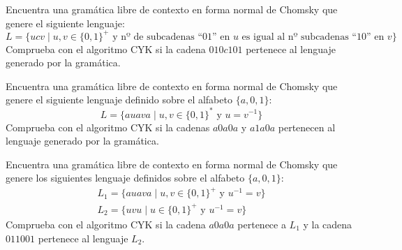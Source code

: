 \begin{ejercicio}\label{ej:1.6.11}
    Encuentra una gramática libre de contexto en forma normal de Chomsky que genere el siguiente lenguaje:
    \begin{equation*}
        L = \{ucv \mid u,v\in {\{0,1\}}^{+} \text{\ y nº de subcadenas ``} 01 \text{'' en\ } u \text{\ es igual al nº subcadenas ``}10 \text{'' en\ }v\}
    \end{equation*}
    Comprueba con el algoritmo CYK si la cadena $010c101$ pertenece al lenguaje generado por la gramática.


    
\end{ejercicio}

\begin{ejercicio}\label{ej:1.6.12}
    Encuentra una gramática libre de contexto en forma normal de Chomsky que genere el siguiente lenguaje definido sobre el alfabeto $\{a,0,1\}$:
    \begin{equation*}
        L = \{auava \mid u,v\in {\{0,1\}}^{\ast} \text{\ y\ } u=v^{-1}\}
    \end{equation*}
    Comprueba con el algoritmo CYK si la cadenas $a0a0a$ y $a1a0a$ pertenecen al lenguaje generado por la gramática.
\end{ejercicio}

\begin{ejercicio}\label{ej:1.6.13}
    Encuentra una gramática libre de contexto en forma normal de Chomsky que genere los siguientes lenguaje definidos sobre el alfabeto $\{a,0,1\}$:
    \begin{gather*}
        L_1 = \{auava \mid u,v \in {\{0,1\}}^{+} \text{\ y\ } u^{-1} = v\} \\
        L_2 = \{uvu \mid u\in {\{0,1\}}^{+}\text{\ y\ } u^{-1} = v\}
    \end{gather*}
    Comprueba con el algoritmo CYK si la cadena $a0a0a$ pertenece a $L_1$ y la cadena $011001$ pertenece al lenguaje $L_2$.
\end{ejercicio}

